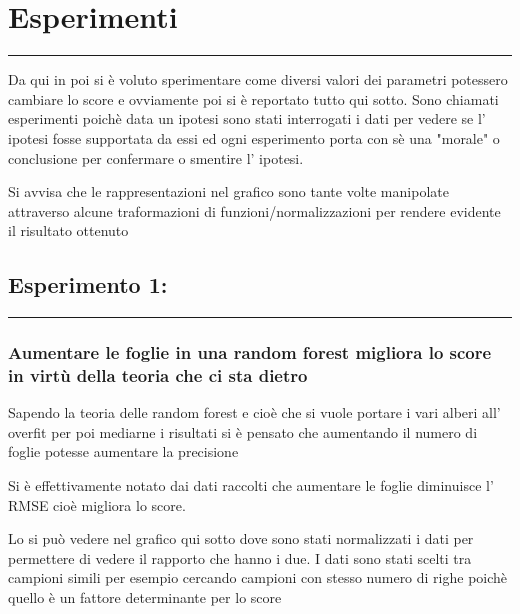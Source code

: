 \documentclass[11pt]{article}
\begin{document}
    \section{Esperimenti}\label{esperimenti}

\begin{center}\rule{0.5\linewidth}{\linethickness}\end{center}

Da qui in poi si è voluto sperimentare come diversi valori dei parametri
potessero cambiare lo score e ovviamente poi si è reportato tutto qui
sotto. Sono chiamati esperimenti poichè data un ipotesi sono stati
interrogati i dati per vedere se l' ipotesi fosse supportata da essi ed
ogni esperimento porta con sè una "morale" o conclusione per confermare
o smentire l' ipotesi.

Si avvisa che le rappresentazioni nel grafico sono tante volte
manipolate attraverso alcune traformazioni di funzioni/normalizzazioni
per rendere evidente il risultato ottenuto

    \subsection{Esperimento 1:}\label{esperimento-1}

\begin{center}\rule{0.5\linewidth}{\linethickness}\end{center}

\subsubsection{Aumentare le foglie in una random forest migliora lo
score in virtù della teoria che ci sta
dietro}\label{aumentare-le-foglie-in-una-random-forest-migliora-lo-score-in-virtuxf9-della-teoria-che-ci-sta-dietro}

Sapendo la teoria delle random forest e cioè che si vuole portare i vari
alberi all' overfit per poi mediarne i risultati si è pensato che
aumentando il numero di foglie potesse aumentare la precisione

Si è effettivamente notato dai dati raccolti che aumentare le foglie
diminuisce l' RMSE cioè migliora lo score.

Lo si può vedere nel grafico qui sotto dove sono stati normalizzati i
dati per permettere di vedere il rapporto che hanno i due. I dati sono
stati scelti tra campioni simili per esempio cercando campioni con
stesso numero di righe poichè quello è un fattore determinante per lo
score
\end{document}
